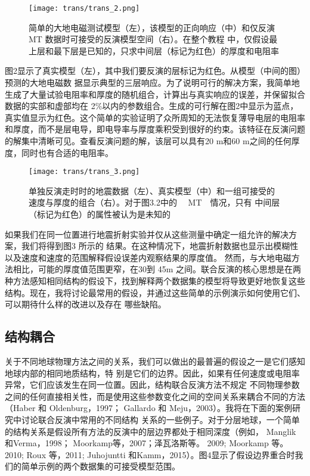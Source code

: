 \begin{figure}
    \centering
    \texttt{[image: trans/trans\_2.png]}
    \caption[]{简单的大地电磁测试模型（左），该模型的正向响应（中）和仅反演 MT 数据时可接受的反演模型空间（右）。在整个教程 中，仅假设最上层和最下层是已知的，只求中间层（标记为红色）的厚度和电阻率}
\end{figure}

图2显示了真实模型（左），其中我们要反演的层标记为红色。从模型（中间的图）预测的大地电磁数 据显示典型的三层响应。为了说明可行的解决方案，我简单地生成了大量试验电阻率和厚度的随机组合，计算出与真实响应的误差，并保留拟合数据的实部和虚部均在 2\%以内的参数组合。生成的可行解在图2中显示为蓝点，真实值显示为红色。这个简单的实验证明了众所周知的无法恢复薄导电层的电阻率和厚度，而不是层电导，即电导率与厚度乘积受到很好的约束。该特征在反演问题的解集中清晰可见。查看反演问题的解，该层可以具有20 m和60 m之间的任何厚度，同时也有合适的电阻率。

\begin{figure}[H]
    \centering
    \texttt{[image: trans/trans\_3.png]}
    \caption[]{单独反演走时时的地震数据（左）、真实模型（中）和一组可接受的速度与厚度的组合（右）。对于图3.2中的   MT  情况，只有 中间层（标记为红色）的属性被认为是未知的}
\end{figure}

如果我们在同一位置进行地震折射实验并仅从这些测量中确定一组允许的解决方案，我们将得到图3 所示的 结果。在这种情况下，地震折射数据也显示出模糊性以及速度和速度的范围解释假设误差内观察结果的厚度值。 然而，与大地电磁方法相比，可能的厚度值范围更窄，在30到 45m 之间。联合反演的核心思想是在两种方法感知相同结构的假设下，找到解释两个数据集的模型将导致更好地恢复这些 结构。现在，我将讨论最常用的假设，并通过这些简单的示例演示如何使用它们、可以期待什么样的改进以及存在 哪些缺陷。


\subsection{结构耦合}

关于不同地球物理方法之间的关系，我们可以做出的最普遍的假设之一是它们感知地球内部的相同地质结构，特 别是它们的边界。因此，如果有任何速度或电阻率异常，它们应该发生在同一位置。因此，结构联合反演方法不规定 不同物理参数之间的任何直接相关性，而是使用这些参数变化之间的空间关系来耦合不同的方法（Haber 和 Oldenburg，1997； Gallardo 和 Meju，2003）。我将在下面的案例研究中讨论联合反演中常用的不同结构 关系的一些例子。对于分层地球，一个简单的结构关系是假设所有方法的反演中的层边界都处于相同深度（例如， Manglik 和Verma，1998； Moorkamp等，2007；泽瓦洛斯等。 2009; Moorkamp 等。2010; Roux 等，2011; Juhojuntti 和Kamm，2015）。图4显示了假设边界重合时我们的简单示例的两个数据集的可接受模型范围。

